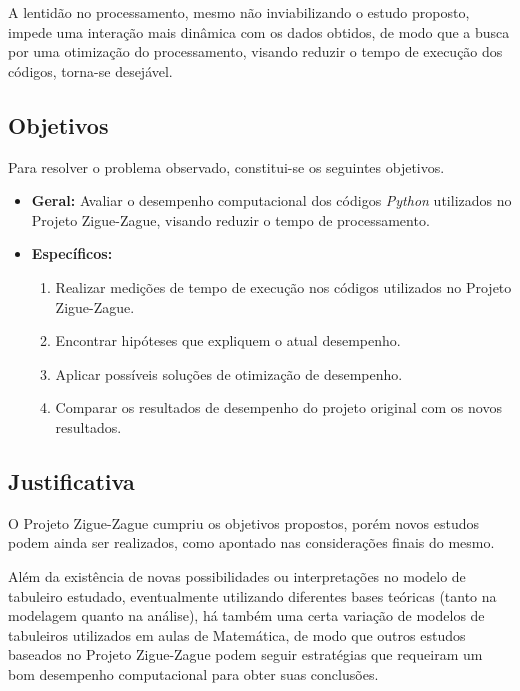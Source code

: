 \documentclass[12pt]{article}
\begin{document}
A lentidão no processamento, mesmo não inviabilizando o estudo proposto, impede uma interação mais dinâmica com os dados obtidos, de modo que a busca por uma otimização do processamento, visando reduzir o tempo de execução dos códigos, torna-se desejável.

\subsection{Objetivos}
\label{objetivos}

Para resolver o problema observado, constitui-se os seguintes objetivos.


\begin{itemize}
	\item \textbf{Geral:} Avaliar o desempenho computacional dos códigos \textit{Python} utilizados no Projeto Zigue-Zague, visando reduzir o tempo de processamento.
	\item \textbf{Específicos:}
	\begin{enumerate}
		\item Realizar medições de tempo de execução nos códigos utilizados no Projeto Zigue-Zague.
		\item Encontrar hipóteses que expliquem o atual desempenho.
		\item Aplicar possíveis soluções de otimização de desempenho.
		\item Comparar os resultados de desempenho do projeto original com os novos resultados.
	\end{enumerate}
\end{itemize}

\subsection{Justificativa}
\label{justificativa}

O Projeto Zigue-Zague cumpriu os objetivos propostos, porém novos estudos podem ainda ser realizados, como apontado nas considerações finais do mesmo.

Além da existência de novas possibilidades ou interpretações no modelo de tabuleiro estudado, eventualmente utilizando diferentes bases teóricas (tanto na modelagem quanto na análise), há também uma certa variação de modelos de tabuleiros utilizados em aulas de Matemática, de modo que outros estudos baseados no Projeto Zigue-Zague podem seguir estratégias que requeiram um bom desempenho computacional para obter suas conclusões.
\end{document}
